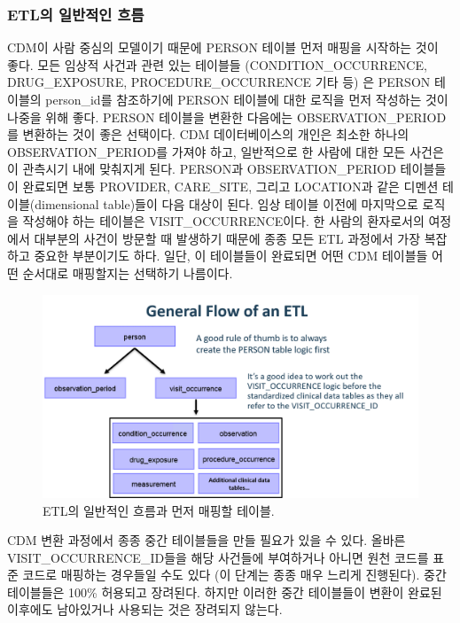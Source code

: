 \documentclass[11pt]{book}
\theoremstyle{definition}
\theoremstyle{definition}
\theoremstyle{definition}
\theoremstyle{remark}
\begin{document}
\subsubsection*{ETL의 일반적인 흐름}\label{etl--}

CDM이 사람 중심의 모델이기 때문에 PERSON 테이블 먼저 매핑을 시작하는
것이 좋다. 모든 임상적 사건과 관련 있는 테이블들 (CONDITION\_OCCURRENCE,
DRUG\_EXPOSURE, PROCEDURE\_OCCURRENCE 기타 등) 은 PERSON 테이블의
person\_id를 참조하기에 PERSON 테이블에 대한 로직을 먼저 작성하는 것이
나중을 위해 좋다. PERSON 테이블을 변환한 다음에는 OBSERVATION\_PERIOD를
변환하는 것이 좋은 선택이다. CDM 데이터베이스의 개인은 최소한 하나의
OBSERVATION\_PERIOD를 가져야 하고, 일반적으로 한 사람에 대한 모든 사건은
이 관측시기 내에 맞춰지게 된다. PERSON과 OBSERVATION\_PERIOD 테이블들이
완료되면 보통 PROVIDER, CARE\_SITE, 그리고 LOCATION과 같은 디멘션
테이블(dimensional table)들이 다음 대상이 된다. 임상 테이블 이전에
마지막으로 로직을 작성해야 하는 테이블은 VISIT\_OCCURRENCE이다. 한
사람의 환자로서의 여정에서 대부분의 사건이 방문할 때 발생하기 때문에
종종 모든 ETL 과정에서 가장 복잡하고 중요한 부분이기도 하다. 일단, 이
테이블들이 완료되면 어떤 CDM 테이블들 어떤 순서대로 매핑할지는 선택하기
나름이다.

\begin{figure}

{\centering \includegraphics[width=1\linewidth]{images/ExtractTransformLoad/flowOfEtl} 

}

\caption{ETL의 일반적인 흐름과 먼저 매핑할 테이블.}\label{fig:etlFlow}
\end{figure}

CDM 변환 과정에서 종종 중간 테이블들을 만들 필요가 있을 수 있다. 올바른
VISIT\_OCCURRENCE\_ID들을 해당 사건들에 부여하거나 아니면 원천 코드를
표준 코드로 매핑하는 경우들일 수도 있다 (이 단계는 종종 매우 느리게
진행된다). 중간 테이블들은 100\% 허용되고 장려된다. 하지만 이러한 중간
테이블들이 변환이 완료된 이후에도 남아있거나 사용되는 것은 장려되지
않는다.
\end{document}

